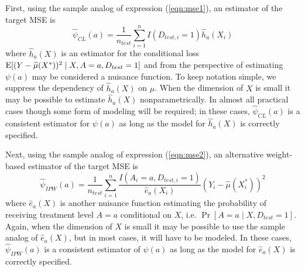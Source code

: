 First, using the sample analog of expression (\ref{eqn:mse1}), an estimator of the target MSE is 
\begin{equation}\label{eqn:cl_estimator}
    \widehat{\psi}_{CL}(a) = \frac{1}{n_{test}} \sum_{i=1}^nI(D_{test, i} = 1)\widehat{h}_a(X_i)
\end{equation}
where $\widehat{h}_a(X)$ is an estimator for the conditional loss $\operatorname{E}[(Y - \widehat{\mu}(X^*))^2 \mid X, A=a, D_{test} = 1]$ and from the perspective of estimating $\psi(a)$ may be considered a nuisance function. To keep notation simple, we suppress the dependency of $\widehat{h}_a(X)$ on $\widehat{\mu}$. When the dimension of $X$ is small it may be possible to estimate $\widehat{h}_a(X)$ nonparametrically. In almost all practical cases though some form of modeling will be required; in these cases, $\widehat{\psi}_{CL}(a)$ is a consistent estimator for $\psi(a)$ as long as the model for $\widehat{h}_a(X)$ is correctly specified.

Next, using the sample analog of expression (\ref{eqn:mse2}), an alternative weight-based estimator of the target MSE is 
\begin{equation}\label{eqn:ipw_estimator}
    \widehat{\psi}_{IPW}(a) = \frac{1}{n_{test}} \sum_{i=1}^n \frac{I(A_i = a, D_{test, i} = 1)}{\widehat{e}_a(X_i)}(Y_i - \widehat{\mu}(X^*_i))^2
\end{equation}
where $\widehat{e}_a(X)$ is another nuisance function estimating the probability of receiving treatment level $A = a$ conditional on $X$, i.e. $\Pr[A = a \mid X, D_{test} = 1]$. Again, when the dimension of $X$ is small it may be possible to use the sample analog of $\widehat{e}_a(X)$, but in most cases, it will have to be modeled. In these cases, $\widehat{\psi}_{IPW}(a)$ is a consistent estimator of $\psi(a)$ as long as the model for $\widehat{e}_a(X)$ is correctly specified.

